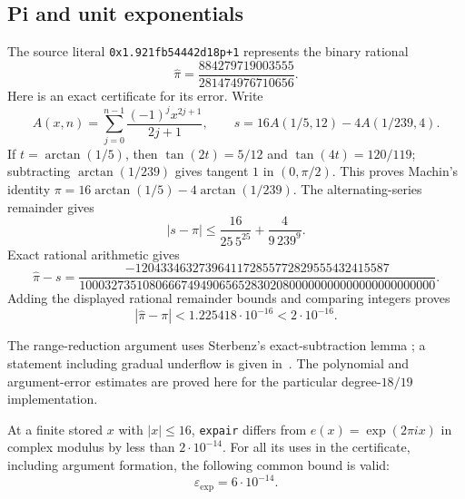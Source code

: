 \subsection{Pi and unit exponentials}
\label{round:exponentials}

The source literal \texttt{0x1.921fb54442d18p+1} represents the
binary rational
\[
 \widehat\pi=\frac{884279719003555}{281474976710656}.
\]
Here is an exact certificate for its error.  Write
\[
 A(x,n)=\sum_{j=0}^{n-1}\frac{(-1)^j x^{2j+1}}{2j+1},\qquad
 s=16A(1/5,12)-4A(1/239,4).
\]
If $t=\arctan(1/5)$, then $\tan(2t)=5/12$ and
$\tan(4t)=120/119$; subtracting $\arctan(1/239)$ gives tangent $1$
in $(0,\pi/2)$.  This proves Machin's identity
$\pi=16\arctan(1/5)-4\arctan(1/239)$.
The alternating-series remainder gives
\[
 |s-\pi|\le \frac{16}{25\,5^{25}}+\frac{4}{9\,239^9}.
\]
Exact rational arithmetic gives
\begin{equation}\label{round:pi-rational}
 \widehat\pi-s=
 \frac{-1204334632739641172855772829555432415587}
 {10003273510806667494906565283020800000000000000000000000}.
\end{equation}
Adding the displayed rational remainder bounds and comparing integers
proves
\begin{equation}\label{round:pi-error}
 |\widehat\pi-\pi|<1.225418\cdot10^{-16}<2\cdot10^{-16}.
\end{equation}

The range-reduction argument uses Sterbenz's exact-subtraction lemma
\cite{Sterbenz1974FloatingPoint}; a statement including gradual
underflow is given in~\cite[Theorem~2.5 and the following discussion]{Higham2002Accuracy}.
The polynomial and argument-error estimates are proved here for the
particular degree-$18/19$ implementation.

\begin{lemma}\label{round:expair}
At a finite stored $x$ with $|x|\le16$, \texttt{expair} differs from
$e(x)=\exp(2\pi i x)$ in complex modulus by less than $2\cdot10^{-14}$.
For all its uses in the certificate, including argument formation,
the following common bound is valid:
\begin{equation}\label{round:exp-budget}
 \varepsilon_{\exp}=6\cdot10^{-14}.
\end{equation}
\end{lemma}

